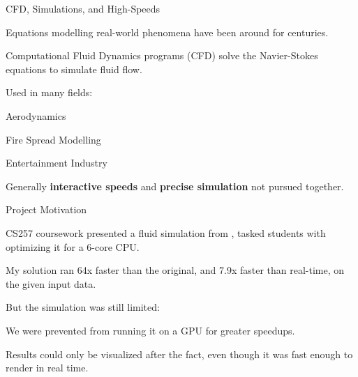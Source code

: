 \begin{frame}{CFD, Simulations, and High-Speeds}
    \begin{wideitemize}
        \item Equations modelling real-world phenomena have been around for centuries.
        \item Computational Fluid Dynamics programs (CFD) solve the Navier-Stokes equations to simulate fluid flow.
        \item Used in many fields:
        \begin{wideitemize}
            \item Aerodynamics \parencite{jameson2002}
            \item Fire Spread Modelling \parencite{Sullivan_2009}
            \item Entertainment Industry \parencite{article:FluidDynamicsOnBigScreen,paper:GameFluidSummary:medveckyreal}
        \end{wideitemize}
        \item Generally \textbf{interactive speeds} and \textbf{precise simulation} not pursued together.
    \end{wideitemize}
\end{frame}

\begin{frame}{Project Motivation}
    \begin{wideitemize}
        \item CS257 coursework presented a fluid simulation from \parencite{book:griebel1998numerical}, tasked students with optimizing it for a 6-core CPU.
        \item My solution \parencite{modules:aca257submission} ran 64x faster than the original, and 7.9x faster than real-time, on the given input data.
        \item But the simulation was still limited:
        \begin{wideitemize}
            \normalsize
            \item We were prevented from running it on a GPU for greater speedups.
            \item Results could only be visualized after the fact, even though it was fast enough to render in real time.
        \end{wideitemize}
    \end{wideitemize}
\end{frame}


